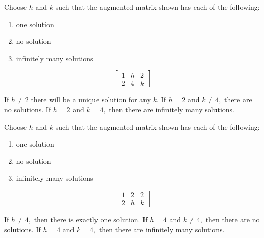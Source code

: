 \documentclass{ximera}
\begin{document}
\begin{problem}\label{prb:2.13}
Choose $h$ and $k$ such that the augmented matrix shown has each of the following:
\begin{enumerate}
\item one solution
\item no solution
\item infinitely many solutions
\end{enumerate}
\begin{equation*}
\left[
\begin{array}{rr|r}
1 & h & 2 \\
2 & 4 & k
\end{array}
\right]
\end{equation*}
\begin{hint}
If $h\neq 2$ there will be a unique solution for any $k$. If $h=2$ and $%
k\neq 4,$ there are no solutions. If $h=2$ and $k=4,$ then there are
infinitely many solutions.
\end{hint}
\end{problem}


\begin{problem}\label{prb:2.14}
Choose $h$ and $k$ such that the augmented matrix shown has each of the following:
\begin{enumerate}
\item one solution
\item no solution
\item infinitely many solutions
\end{enumerate}
\begin{equation*}
\left[
\begin{array}{rr|r}
1 & 2 & 2 \\
2 & h & k
\end{array}
\right]
\end{equation*}
\begin{hint}
If $h\neq 4,$ then there is exactly one solution. If $h=4$ and $k\neq 4,$
then there are no solutions. If $h=4$ and $k=4,$ then there are infinitely
many solutions.
\end{hint}
\end{problem}
\end{document}
